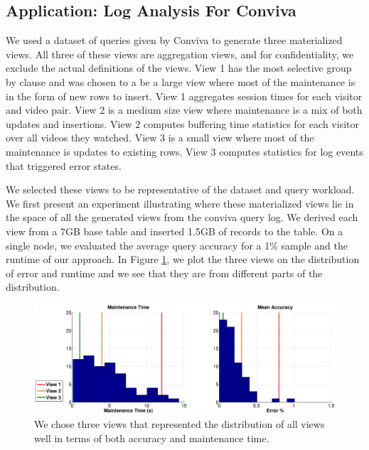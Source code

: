 \subsection{Application: Log Analysis For Conviva}
We used a dataset of queries given by Conviva to generate three materialized views.
All three of these views are aggregation views, and for confidentiality, we exclude the actual definitions of the views. 
View 1 has the most selective group by clause and was chosen to a be a large view where most of the maintenance is in the form of new rows to insert.
View 1 aggregates session times for each visitor and video pair.
View 2 is a medium size view where maintenance is a mix of both updates and insertions.
View 2 computes buffering time statistics for each visitor over all videos they watched.
View 3 is a small view where most of the maintenance is updates to existing rows.
View 3 computes statistics for log events that triggered error states.

We selected these views to be representative of the dataset and query workload. 
We first present an experiment illustrating where these materialized views lie in the space of all the generated views from the conviva query log.
We derived each view from a 7GB base table and inserted 1.5GB of records to the table. 
On a single node, we evaluated the average query accuracy for a 1\% sample and the runtime of our approach.
In Figure \ref{exp12conviva}, we plot the three views on the distribution of error and runtime and we see that they 
are from different parts of the distribution.
\begin{figure}[ht!]
\label{exp12conviva}
\hspace{-3.5em}
\includegraphics[scale=0.23]{exp/conviva_efficiency_accuracy.eps}
 \caption{We chose three views that represented the distribution of all views well in terms of both accuracy and maintenance time. }
\end{figure}


